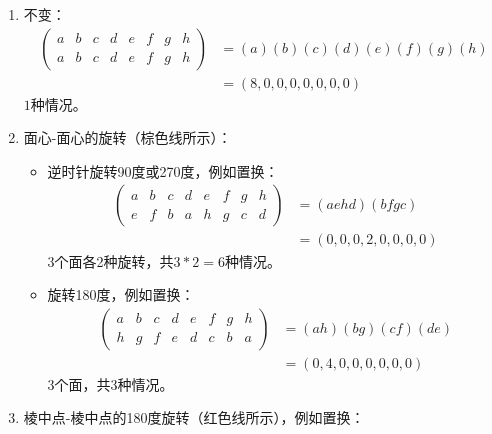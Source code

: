 \begin{solution}
\begin{center}
   \end{center}
   \begin{enumerate}
      \item 不变：
      \begin{align*}
         \left(
            \begin{matrix}
               a & b & c & d & e & f & g & h\\
               a & b & c & d & e & f & g & h
            \end{matrix}
            \right) &= (a)(b)(c)(d)(e)(f)(g)(h) \\
            &= (8,0,0,0,0,0,0,0)
      \end{align*}
      $1$种情况。
      \item 面心-面心的旋转（棕色线所示）：
      \begin{itemize}
         \item 逆时针旋转90度或270度，例如置换：
         \begin{align*}
            \left(
               \begin{matrix}
                  a & b & c & d & e & f & g & h\\
                  e & f & b & a & h & g & c & d
               \end{matrix}
               \right) &= (aehd)(bfgc) \\
               &= (0,0,0,2,0,0,0,0)
         \end{align*}
         3个面各2种旋转，共$3*2 = 6$种情况。
      \item 旋转180度，例如置换：
      \begin{align*}
         \left(
            \begin{matrix}
               a & b & c & d & e & f & g & h\\
               h & g & f & e & d & c & b & a
            \end{matrix}
            \right) &= (ah)(bg)(cf)(de) \\
            &= (0,4,0,0,0,0,0,0)
      \end{align*}
      3个面，共$3$种情况。
      \end{itemize}
      \item 棱中点-棱中点的180度旋转（红色线所示），例如置换：
      \begin{align*}

\end{align*}
\end{enumerate}
\end{solution}
